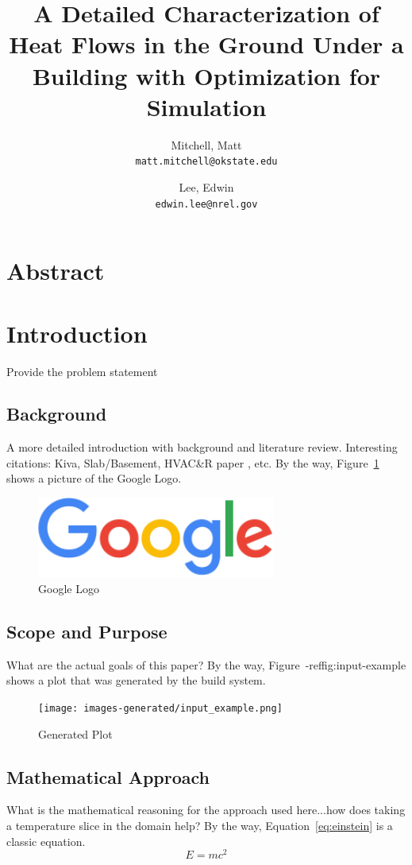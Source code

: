 \documentclass{article}
\title{A Detailed Characterization of Heat Flows in the Ground Under a Building with Optimization for Simulation}
\author{
  Mitchell, Matt\\
  \texttt{matt.mitchell@okstate.edu}
  \and
  Lee, Edwin\\
  \texttt{edwin.lee@nrel.gov}
}
\date{}
\begin{document}
 
 \maketitle
 
 \section*{Abstract}
  \lipsum[1]

 \section*{Introduction}
  Provide the problem statement
  \lipsum[1]

  \subsection*{Background}
   A more detailed introduction with background and literature review.  Interesting citations: Kiva, Slab/Basement, HVAC\&R paper \citep{Lee2013}, etc.  By the way, Figure~\ref{fig:google} shows a picture of the Google Logo.
   \begin{figure}
    \centering
    \label{fig:google}
    \includegraphics[width=0.7\textwidth]{images/googlelogo.png}
    \caption{Google Logo}
   \end{figure}
   \lipsum[1]

  \subsection*{Scope and Purpose}
   What are the actual goals of this paper?  By the way, Figure~-ref{fig:input-example} shows a plot that was generated by the build system.
   \begin{figure}
    \centering
    \label{fig:input-example}
    \texttt{[image: images-generated/input\_example.png]}
    \caption{Generated Plot}
   \end{figure}
   \lipsum[1]

  \subsection*{Mathematical Approach}
   What is the mathematical reasoning for the approach used here...how does taking a temperature slice in the domain help?  By the way, Equation~\eqref{eq:einstein} is a classic equation.
   \begin{equation}
    \label{eq:einstein}
    E = m c^2
   \end{equation}
   \lipsum[1]
\end{document}

